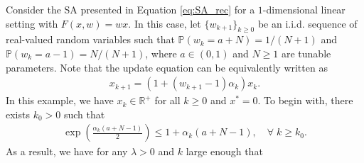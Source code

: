 \documentclass[letterpaper, 10 pt]{article}
\begin{document}
Consider the SA presented in Equation \eqref{eq:SA_rec} for a $1$-dimensional linear setting with $F(x,w)=wx$. In this case, let $\{w_{k+1}\}_{k\geq 0}$ be an i.i.d. sequence of real-valued random variables such that 
$\mathbb{P}\left(w_k=a+N\right)=1/(N+1)$ and $\mathbb{P}\left(w_k=a-1\right)=N/(N+1)$, where $a\in (0,1)$ and $N\geq 1$ are tunable parameters.
Note that the update equation can be equivalently written as
\begin{align}\label{algo:example}
    x_{k+1} =(1+(w_{k+1}-1)\alpha_k)x_k.
\end{align}
In this example, we have $x_k\in\mathbb{R}^+$ for all $k\geq0$ and $x^*=0$. To begin with, there exists $k_0>0$ such that
\begin{align}\label{eq:exp_bound}
    \exp\left(\frac{\alpha_k(a+N-1)}{2}\right) \leq 1+\alpha_k(a+N-1),\quad \forall\; k\geq k_0.
\end{align}
As a result, we have for any $\lambda>0$ and $k$ large enough that
\end{document}
